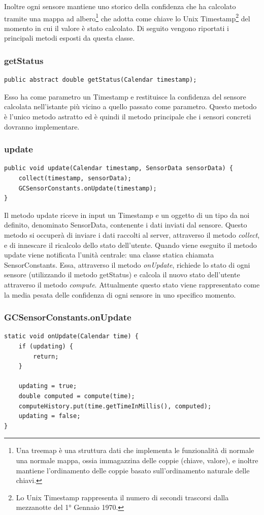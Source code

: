 Inoltre ogni sensore mantiene uno storico della confidenza che ha calcolato tramite una mappa ad albero\footnote{Una treemap è una struttura dati che implementa le funzionalità di normale una normale mappa, ossia immagazzina delle coppie (chiave, valore), e inoltre mantiene l'ordinamento delle coppie basato sull'ordinamento naturale delle chiavi.} che adotta come chiave lo Unix Timestamp\footnote{Lo Unix Timestamp rappresenta il numero di secondi trascorsi dalla mezzanotte del 1° Gennaio 1970.} del momento in cui il valore è stato calcolato. Di seguito vengono riportati i principali metodi esposti da questa classe.
\subsubsection{getStatus}
\begin{verbatim}
public abstract double getStatus(Calendar timestamp);
\end{verbatim}
Esso ha come parametro un Timestamp e restituisce la confidenza del sensore calcolata nell'istante più vicino a quello passato come parametro. Questo metodo è l'unico metodo astratto ed è quindi il metodo principale che i sensori concreti dovranno implementare.
\subsubsection{update}

\begin{verbatim}
public void update(Calendar timestamp, SensorData sensorData) {
    collect(timestamp, sensorData);
    GCSensorConstants.onUpdate(timestamp);
}
\end{verbatim}
Il metodo update riceve in input un Timestamp e un oggetto di un tipo da noi definito, denominato SensorData, contenente i dati inviati dal sensore. Questo metodo si occuperà di inviare i dati raccolti al server, attraverso il metodo \textit{collect}, e di innescare il ricalcolo dello stato dell'utente.
Quando viene eseguito il metodo update viene notificata l'unità centrale: una classe statica chiamata SensorConstants. Essa, attraverso il metodo \textit{onUpdate}, richiede lo stato di ogni sensore (utilizzando il metodo getStatus) e calcola il nuovo stato dell'utente attraverso il metodo \textit{compute}. Attualmente questo stato viene rappresentato come la media pesata delle confidenza di ogni sensore in uno specifico momento.

\subsubsection{GCSensorConstants.onUpdate}
\begin{verbatim}
static void onUpdate(Calendar time) {
    if (updating) {
        return;
    }

    updating = true;
    double computed = compute(time);
    computeHistory.put(time.getTimeInMillis(), computed);
    updating = false;
}
\end{verbatim}

